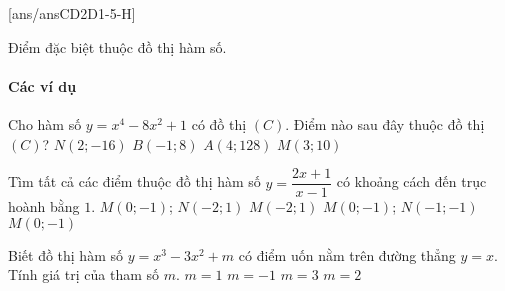 [ans/ansCD2D1-5-H]
\begin{dang}{Điểm đặc biệt thuộc đồ thị hàm số}.
\end{dang}
\paragraph{Các ví dụ}
\begin{vd}%
	Cho hàm số $y=x^4-8x^2+1$ có đồ thị $(C)$. Điểm nào sau đây thuộc đồ thị $(C)$? 
	\choice
	{$N(2;-16)$}
	{$B(-1; 8)$}
	{$A(4; 128)$}
	{\True $M(3; 10)$}
\end{vd}
\begin{vd}%
	Tìm tất cả các điểm thuộc đồ thị hàm số $y=\dfrac{2x+1}{x-1}$ có khoảng cách đến trục hoành bằng $1$. 
	\choice
	{\True $M(0;-1)$; $N(-2;1)$}
	{$M(-2;1)$}
	{$M(0;-1)$; $N(-1;-1)$}
	{$M(0;-1)$}
\end{vd}
\begin{vd}%
	Biết đồ thị hàm số $y=x^3-3x^2+m$ có điểm uốn nằm trên đường thẳng $y=x$. Tính giá trị của tham số $m$. 
	\choice
	{$m=1$}
	{$m=-1$}
	{\True $m=3$}
	{$m=2$}
\end{vd}
